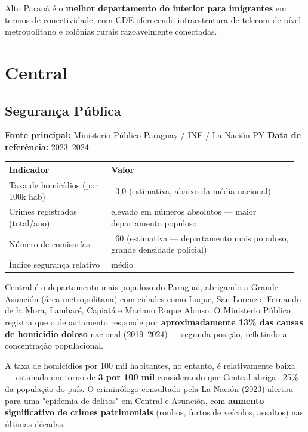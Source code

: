 Alto Paraná é o \textbf{melhor departamento do interior para imigrantes} em termos de conectividade, com CDE oferecendo infraestrutura de telecom de nível metropolitano e colônias rurais razoavelmente conectadas.





\clearpage
\section{Central}
\label{sec:dept_11_Central}

\subsection{Segurança Pública}

\textbf{Fonte principal:} Ministerio Público Paraguay / INE / La Nación PY
\textbf{Data de referência:} 2023--2024


{\small
\setlength{\tabcolsep}{3pt}
\renewcommand{\arraystretch}{1.12}
\begin{tabularx}{\linewidth}{>{\raggedright\arraybackslash}p{0.34\linewidth} >{\raggedright\arraybackslash}p{0.62\linewidth}}
\toprule
Indicador & Valor \\
\midrule
Taxa de homicídios (por 100k hab) & ~3,0 (estimativa, abaixo da média nacional) \\
Crimes registrados (total/ano) & elevado em números absolutos --- maior departamento populoso \\
Número de comisarías & ~60 (estimativa --- departamento mais populoso, grande densidade policial) \\
Índice segurança relativo & médio \\
\bottomrule
\end{tabularx}
}


Central é o departamento mais populoso do Paraguai, abrigando a Grande Asunción (área metropolitana) com cidades como Luque, San Lorenzo, Fernando de la Mora, Lambaré, Capiatá e Mariano Roque Alonso. O Ministerio Público registra que o departamento responde por \textbf{aproximadamente 13\% das causas de homicídio doloso} nacional (2019--2024) --- segunda posição, refletindo a concentração populacional.

A taxa de homicídios por 100 mil habitantes, no entanto, é relativamente baixa --- estimada em torno de \textbf{3 por 100 mil} considerando que Central abriga ~25\% da população do país. O criminólogo consultado pela La Nación (2023) alertou para uma "epidemia de delitos" em Central e Asunción, com \textbf{aumento significativo de crimes patrimoniais} (roubos, furtos de veículos, assaltos) nas últimas décadas.

